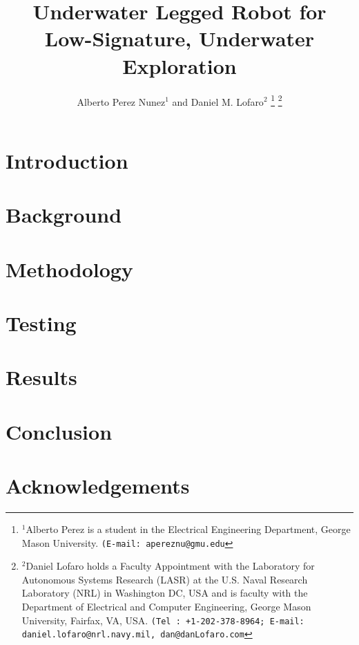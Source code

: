 \documentclass[letterpaper, 10 pt, conference]{ieeeconf}  %
\title{\LARGE \bf
Underwater Legged Robot for Low-Signature, Underwater Exploration%
}
\author{Alberto Perez Nunez$^{1}$ and Daniel M. Lofaro$^{2}$%
\thanks{$^{1}$Alberto Perez is a student in the Electrical Engineering Department, George Mason University.
{\tt\small (E-mail: apereznu@gmu.edu}}%
\thanks{$^{2}$Daniel Lofaro holds a Faculty Appointment with the Laboratory for Autonomous Systems Research (LASR) at the U.S. Naval Research Laboratory (NRL) in Washington DC, USA and is faculty with the Department of Electrical and Computer Engineering, George Mason University, Fairfax, VA, USA.
	{\tt\small (Tel : +1-202-378-8964; E-mail: daniel.lofaro@nrl.navy.mil, dan@danLofaro.com}}%
}
\begin{document}
\maketitle
\thispagestyle{empty}
\pagestyle{empty}


\begin{abstract}

\end{abstract}


\section{Introduction}



\section{Background}\label{sec:background}


\section{Methodology}


\section{Testing}


\section{Results}


\section{Conclusion}


\section*{Acknowledgements}





\end{document}
